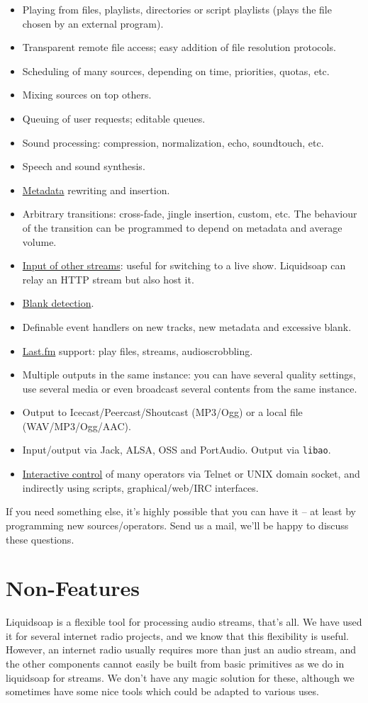 \begin{itemize}
\item Playing from files, playlists, directories or script playlists (plays the file chosen by an external program).
\item Transparent remote file access; easy addition of file resolution protocols.
\item Scheduling of many sources, depending on time, priorities, quotas, etc.
\item Mixing sources on top others.
\item Queuing of user requests; editable queues.
\item Sound processing: compression, normalization, echo, soundtouch, etc.
\item Speech and sound synthesis.
\item \href{metadata.html}{Metadata} rewriting and insertion.
\item Arbitrary transitions: cross-fade, jingle insertion, custom, etc. The behaviour of the transition can be programmed to depend on metadata and average volume.
\item \href{http_input.html}{Input of other streams}: useful for switching to a live show. Liquidsoap can relay an HTTP stream but also host it.
\item \href{blank.html}{Blank detection}.
\item Definable event handlers on new tracks, new metadata and excessive blank.
\item \href{cookbook.html#lastfm}{Last.fm} support: play files, streams, audioscrobbling.
\item Multiple outputs in the same instance: you can have several quality settings, use several media or even broadcast several contents from the same instance.
\item Output to Icecast/Peercast/Shoutcast (MP3/Ogg) or a local file (WAV/MP3/Ogg/AAC).
\item Input/output via Jack, ALSA, OSS and PortAudio. Output via \verb+libao+.
\item \href{advanced.html}{Interactive control} of many operators via Telnet or UNIX domain socket, and indirectly using scripts, graphical/web/IRC interfaces.

\end{itemize}
If you need something else, it's highly possible that you can have it -- at least by programming new sources/operators. Send us a mail, we'll be happy to discuss these questions.

\section{Non-Features}
Liquidsoap is a flexible tool for processing audio streams, that's all. We have used it for several internet radio projects, and we know that this flexibility is useful. However, an internet radio usually requires more than just an audio stream, and the other components cannot easily be built from basic primitives as we do in liquidsoap for streams. We don't have any magic solution for these, although we sometimes have some nice tools which could be adapted to various uses.

